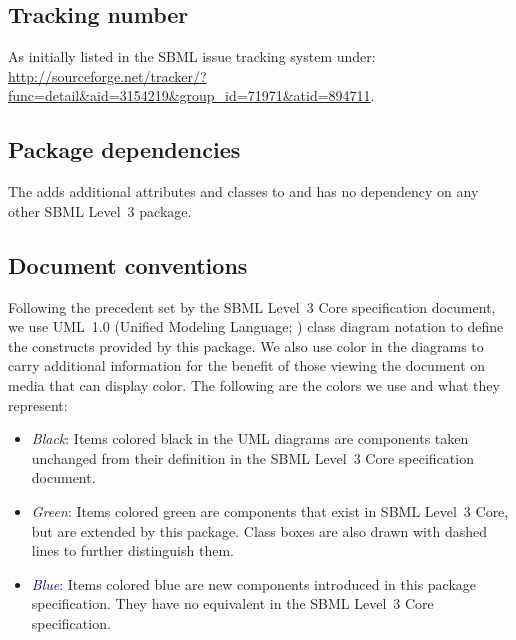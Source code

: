 \subsection{Tracking number}
As initially listed in the SBML issue tracking system under:\\
\url{http://sourceforge.net/tracker/?func=detail&aid=3154219&group_id=71971&atid=894711}.

\subsection{Package dependencies}

The \FBCPackage adds additional attributes and classes to \sbmlthreecore and has no dependency on any other SBML Level~3 package.


\subsection{Document conventions} \label{conventions}

Following the precedent set by the SBML Level~3 Core specification
document, we use UML~1.0 (Unified Modeling Language;
\citealt{eriksson:1998,oestereich:1999}) class diagram notation to
define the constructs provided by this package. We also use color in the
diagrams to carry additional information for the benefit of those
viewing the document on media that can display color. The following are
the colors we use and what they represent:

\begin{itemize}

\item[\raisebox{2.75pt}{\colorbox{black}{\rule{0.8pt}{0.8pt}}}]
\emph{Black}: Items colored black in the UML diagrams are components
taken unchanged from their definition in the SBML Level~3 Core
specification document.

\item[\raisebox{2.75pt}{\colorbox{mediumgreen}{\rule{0.8pt}{0.8pt}}}]
\emph{\textcolor{mediumgreen}{Green}}: Items colored green are
components that exist in SBML Level~3 Core, but are extended by this
package. Class boxes are also drawn with dashed lines to further
distinguish them.

\item[\raisebox{2.75pt}{\colorbox{darkblue}{\rule{0.8pt}{0.8pt}}}]
\emph{\textcolor{darkblue}{Blue}}: Items colored blue are new components
introduced in this package specification. They have no equivalent in the
SBML Level~3 Core specification.


\end{itemize}

